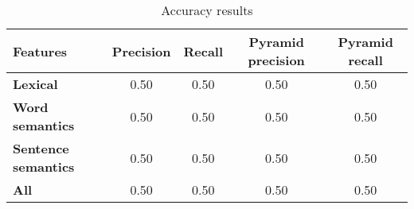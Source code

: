 \begin{table}[H]
\centering    
\begin{scriptsize}
\begin{threeparttable}
\begin{tabular}{lcccc}


\textbf{Features} & 
\textbf{Precision} & \textbf{Recall} & 
\parbox[c][.7cm][c]{1.5cm}{\centering \textbf{Pyramid precision}} & 
\parbox[c][.7cm][c]{1.5cm}{\centering \textbf{Pyramid recall}} \\


\hline

\textbf{Lexical} &
0.50 & 0.50 & 
0.50 & 0.50 
\\

\textbf{Word semantics} &
0.50 & 0.50 & 
0.50 & 0.50 
\\

\textbf{Sentence semantics} &
0.50 & 0.50 & 
0.50 & 0.50 
\\

\hline
\textbf{All} &
0.50 & 0.50 & 
0.50 & 0.50 
\\
\hline

\end{tabular}
\end{threeparttable}
\end{scriptsize}
\caption{Accuracy results}
\label{tbl:approach-results-overall}
\end{table}

